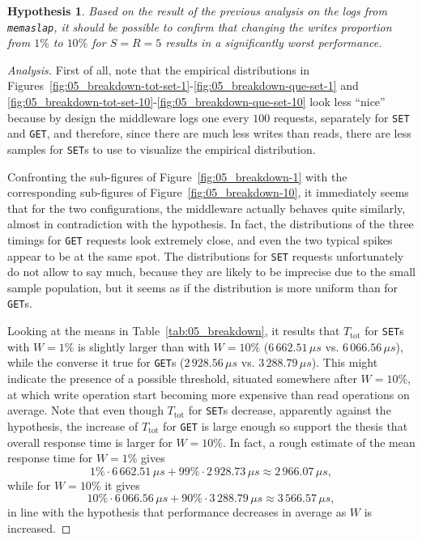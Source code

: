 \documentclass[11pt]{article}
\newtheorem{hyp}{Hypothesis}
\theoremstyle{definition}
\newenvironment{ana}[1][\proofname]{\begin{proof}[Analysis]}{\end{proof}}
\newcommand\Ttot{T_{\mathrm{tot}}}
\renewcommand\t\texttt
\begin{document}
\begin{hyp}
    Based on the result of the previous analysis on the logs from \t{memaslap}, it should be possible to confirm that changing the writes proportion from $1\%$ to $10\%$ for $S=R=5$ results in a significantly worst performance.
\end{hyp}
\begin{ana}
    First of all, note that the empirical distributions in Figures~\ref{fig:05_breakdown-tot-set-1}-\ref{fig:05_breakdown-que-set-1} and \ref{fig:05_breakdown-tot-set-10}-\ref{fig:05_breakdown-que-set-10} look less ``nice'' because by design the middleware logs one every $100$ requests, separately for \t{SET} and \t{GET}, and therefore, since there are much less writes than reads, there are less samples for \t{SET}s to use to visualize the empirical distribution.
    
    Confronting the sub-figures of Figure~\ref{fig:05_breakdown-1} with the corresponding sub-figures of Figure~\ref{fig:05_breakdown-10}, it immediately seems that for the two configurations, the middleware actually behaves quite similarly, almost in contradiction with the hypothesis.
    In fact, the distributions of the three timings for \t{GET} requests look extremely close, and even the two typical spikes appear to be at the same spot.
    The distributions for \t{SET} requests unfortunately do not allow to say much, because they are likely to be imprecise due to the small sample population, but it seems as if the distribution is more uniform than for \t{GET}s.
    
    Looking at the means in Table~\ref{tab:05_breakdown}, it results that $\Ttot$ for \t{SET}s with $W=1\%$ is slightly larger than with $W=10\%$ ($6\,662.51\,\mu s$ vs. $6\,066.56\,\mu s$), while the converse it true for \t{GET}s ($2\,928.56\,\mu s$ vs. $3\,288.79\,\mu s$).
    This might indicate the presence of a possible threshold, situated somewhere after $W=10\%$, at which write operation start becoming more expensive than read operations on average.
    Note that even though $\Ttot$ for \t{SET}s decrease, apparently against the hypothesis, the increase of $\Ttot$ for \t{GET} is large enough so support the thesis that overall response time is larger for $W=10\%$.
    In fact, a rough estimate of the mean response time for $W=1\%$ gives
    \[1\%\cdot6\,662.51\,\mu s+99\%\cdot2\,928.73\,\mu s\approx2\,966.07\,\mu s,\]
    while for $W=10\%$ it gives
    \[10\%\cdot6\,066.56\,\mu s+90\%\cdot3\,288.79\,\mu s\approx3\,566.57\,\mu s,\]
    in line with the hypothesis that performance decreases in average as $W$ is increased.
    

\end{ana}
\end{document}
